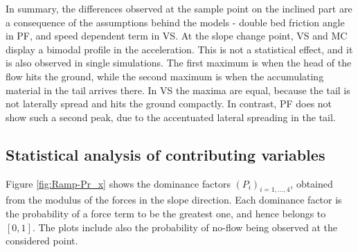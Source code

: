 \documentclass{article}
\begin{document}
In summary, the differences observed at the sample point on the inclined part are a consequence of the assumptions behind the models - double bed friction angle in PF, and speed dependent term in VS. At the slope change point, VS and MC display a bimodal profile in the acceleration. This is not a statistical effect, and it is also observed in single simulations. The first maximum is when the head of the flow hits the ground, while the second maximum is when the accumulating material in the tail arrives there. In VS the maxima are equal, because the tail is not laterally spread and hits the ground compactly. In contrast, PF does not show such a second peak, due to the accentuated lateral spreading in the tail.

\subsection{Statistical analysis of contributing variables}\label{Hq1}
Figure \ref{fig:Ramp-Pr_x} shows the dominance factors $(P_i)_{i=1,\dots,4}$, obtained from the modulus of the forces in the slope direction. Each dominance factor is the probability of a force term to be the greatest one, and hence belongs to $[0,1]$. The plots include also the probability of no-flow being observed at the considered point.
\end{document}
